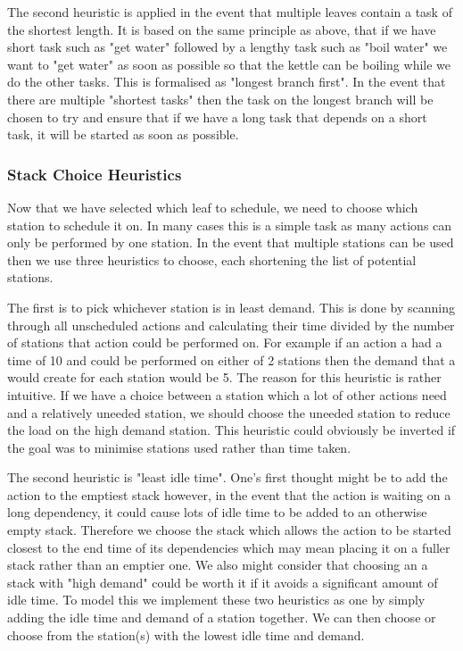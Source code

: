 \documentclass[11pt]{article}
\begin{document}
\medbreak

The second heuristic is applied in the event that multiple leaves contain a task of the shortest length.
It is based on the same principle as above, that if we have short task such as "get water" followed
by a lengthy task such as "boil water" we want to "get water" as soon as possible so that the kettle
can be boiling while we do the other tasks. This is formalised as "longest branch first". In the
event that there are multiple "shortest tasks" then the task on the longest branch will be chosen
to try and ensure that if we have a long task that depends on a short task, it will be started
as soon as possible.

\subsubsection{Stack Choice Heuristics}

Now that we have selected which leaf to schedule, we need to choose which station to schedule it on.
In many cases this is a simple task as many actions can only be performed by one station. In the event
that multiple stations can be used then we use three heuristics to choose, each shortening the list of
potential stations.

\medbreak

The first is to pick whichever station is in least demand. This is done by scanning through all unscheduled
actions and calculating their time divided by the number of stations that action could be performed on.
For example if an action a had a time of 10 and could be performed on either of 2 stations then the demand
that a would create for each station would be 5. The reason for this heuristic is rather intuitive. If we
have a choice between a station which a lot of other actions need and a relatively uneeded station, we should
choose the uneeded station to reduce the load on the high demand station. This heuristic could obviously
be inverted if the goal was to minimise stations used rather than time taken.

\medbreak

The second heuristic is "least idle time". One's first thought might be to add the action to the emptiest
stack however, in the event that the action is waiting on a long dependency, it could cause lots of idle
time to be added to an otherwise empty stack. Therefore we choose the stack which allows the action to be
started closest to the end time of its dependencies which may mean placing it on a fuller stack rather than
an emptier one. We also might consider that choosing an a stack with "high demand" could be worth it if
it avoids a significant amount of idle time. To model this we implement these two heuristics as one by
simply adding the idle time and demand of a station together. We can then choose or choose from the
station(s) with the lowest idle time and demand.
\end{document}
